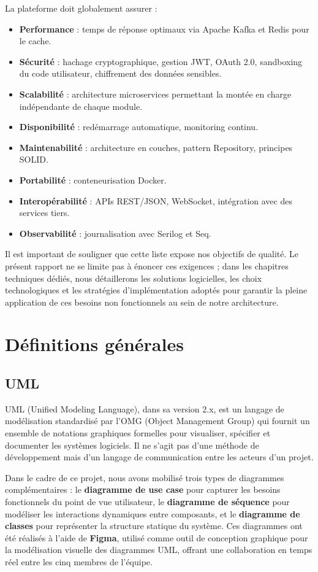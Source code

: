 \documentclass[12pt,a4paper]{report}
\begin{document}
La plateforme doit globalement assurer :
\begin{itemize}
	\item \textbf{Performance} : temps de réponse optimaux via Apache Kafka et Redis pour le cache.
	\item \textbf{Sécurité} : hachage cryptographique, gestion JWT, OAuth 2.0, sandboxing du code utilisateur, chiffrement des données sensibles.
	\item \textbf{Scalabilité} : architecture microservices permettant la montée en charge indépendante de chaque module.
	\item \textbf{Disponibilité} : redémarrage automatique, monitoring continu.
	\item \textbf{Maintenabilité} : architecture en couches, pattern Repository, principes SOLID.
	\item \textbf{Portabilité} : conteneurisation Docker.
	\item \textbf{Interopérabilité} : APIs REST/JSON, WebSocket, intégration avec des services tiers.
	\item \textbf{Observabilité} : journalisation avec Serilog et Seq.
\end{itemize}

Il est important de souligner que cette liste expose nos objectifs de qualité. Le présent rapport ne se limite pas à énoncer ces exigences ; dans les chapitres techniques dédiés, nous détaillerons les solutions logicielles, les choix technologiques et les stratégies d'implémentation adoptés pour garantir la pleine application de ces besoins non fonctionnels au sein de notre architecture.
	\section{Définitions générales}
	
	\subsection{UML}
	UML (Unified Modeling Language), dans sa version 2.x, est un langage de modélisation standardisé
	par l'OMG (Object Management Group) qui fournit un ensemble de notations graphiques formelles pour
	visualiser, spécifier et documenter les systèmes logiciels. Il ne s'agit pas d'une méthode de
	développement mais d'un langage de communication entre les acteurs d'un projet.
	
	Dans le cadre de ce projet, nous avons mobilisé trois types de diagrammes complémentaires : le
	\textbf{diagramme de use case} pour capturer les besoins fonctionnels du point de vue utilisateur,
	le \textbf{diagramme de séquence} pour modéliser les interactions dynamiques entre composants, et
	le \textbf{diagramme de classes} pour représenter la structure statique du système. Ces diagrammes
	ont été réalisés à l'aide de \textbf{Figma}, utilisé comme outil de conception graphique pour la
	modélisation visuelle des diagrammes UML, offrant une collaboration en temps réel entre les cinq
	membres de l'équipe.
	
\end{document}
